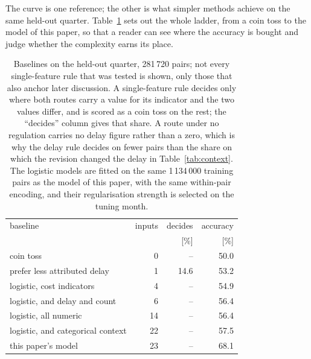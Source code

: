 \documentclass[preprint,authoryear,12pt]{elsarticle}
\begin{document}
The curve is one reference; the other is what simpler methods achieve
on the same held-out quarter. Table~\ref{tab:baselines} sets out the
whole ladder, from a coin toss to the model of this paper, so that a
reader can see where the accuracy is bought and judge whether the
complexity earns its place.

\begin{table}[t]
\caption{Baselines on the held-out quarter, 281\,720 pairs; not every
single-feature rule that was tested is shown, only those that also
anchor later discussion. A
single-feature rule decides only where both routes carry a value for
its indicator and the two values differ, and is scored as a coin toss on
the rest; the ``decides'' column gives that share. A route under no
regulation carries no delay figure rather than a zero, which is why the
delay rule decides on fewer pairs than the share on which the revision
changed the delay in Table~\ref{tab:context}. The logistic models are fitted on the same
1\,134\,000 training pairs as the model of this paper, with the same
within-pair encoding, and their regularisation strength is selected on
the tuning month.}
\label{tab:baselines}
\centering\small
\begin{tabular}{lrrr}
\toprule
baseline & inputs & decides & accuracy \\
         &        & [\%]    & [\%] \\
\midrule
coin toss                        & 0  & --   & 50.0 \\
prefer less attributed delay     & 1  & 14.6 & 53.2 \\
\midrule
logistic, cost indicators        & 4  & --   & 54.9 \\
logistic, and delay and count & 6 & -- & 56.4 \\
logistic, all numeric            & 14 & --   & 56.4 \\
logistic, and categorical context & 22 & --  & 57.5 \\
\midrule
this paper's model               & 23 & --   & 68.1 \\
\bottomrule
\end{tabular}
\end{table}
\end{document}
